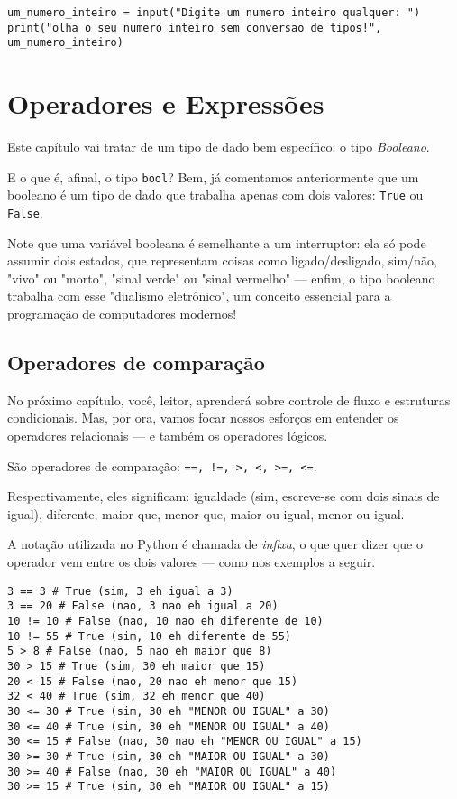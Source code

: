 \documentclass[12pt]{book}
\begin{document}
	\begin{lstlisting}[caption={Entrada de dados sem conversão de tipos}]
um_numero_inteiro = input("Digite um numero inteiro qualquer: ")
print("olha o seu numero inteiro sem conversao de tipos!", um_numero_inteiro)\end{lstlisting}

	
	\chapter{Operadores e Expressões}
	
	Este capítulo vai tratar de um tipo de dado bem específico: o tipo \textit{Booleano}.
	
	E o que é, afinal, o tipo \texttt{bool}? Bem, já comentamos anteriormente que um booleano é um tipo de dado que trabalha apenas com dois valores: \verb*|True| ou \verb*|False|.
	
	Note que uma variável booleana é semelhante a um interruptor: ela só pode assumir dois estados, que representam coisas como ligado/desligado, sim/não, "vivo" ou "morto", "sinal verde" ou "sinal vermelho" — enfim, o tipo booleano trabalha com esse "dualismo eletrônico", um conceito essencial para a programação de computadores modernos!
	
	\section{Operadores de comparação}
	No próximo capítulo, você, leitor, aprenderá sobre controle de fluxo e estruturas condicionais. Mas, por ora, vamos focar nossos esforços em entender os operadores relacionais — e também os operadores lógicos.
	
	São operadores de comparação: \texttt{==, !=, >, <, >=, <=}.
	
	Respectivamente, eles significam: igualdade (sim, escreve-se com dois sinais de igual), diferente, maior que, menor que, maior ou igual, menor ou igual.
	
	A notação utilizada no Python é chamada de \textit{infixa}, o que quer dizer que o operador vem entre os dois valores — como nos exemplos a seguir.
	
	\begin{lstlisting}[caption={Operadores de comparação}]
3 == 3 # True (sim, 3 eh igual a 3)
3 == 20 # False (nao, 3 nao eh igual a 20)
10 != 10 # False (nao, 10 nao eh diferente de 10)
10 != 55 # True (sim, 10 eh diferente de 55)
5 > 8 # False (nao, 5 nao eh maior que 8)
30 > 15 # True (sim, 30 eh maior que 15)
20 < 15 # False (nao, 20 nao eh menor que 15)
32 < 40 # True (sim, 32 eh menor que 40)
30 <= 30 # True (sim, 30 eh "MENOR OU IGUAL" a 30)
30 <= 40 # True (sim, 30 eh "MENOR OU IGUAL" a 40)
30 <= 15 # False (nao, 30 nao eh "MENOR OU IGUAL" a 15)
30 >= 30 # True (sim, 30 eh "MAIOR OU IGUAL" a 30)
30 >= 40 # False (nao, 30 eh "MAIOR OU IGUAL" a 40)
30 >= 15 # True (sim, 30 eh "MAIOR OU IGUAL" a 15)\end{lstlisting} 
	
\end{document}
